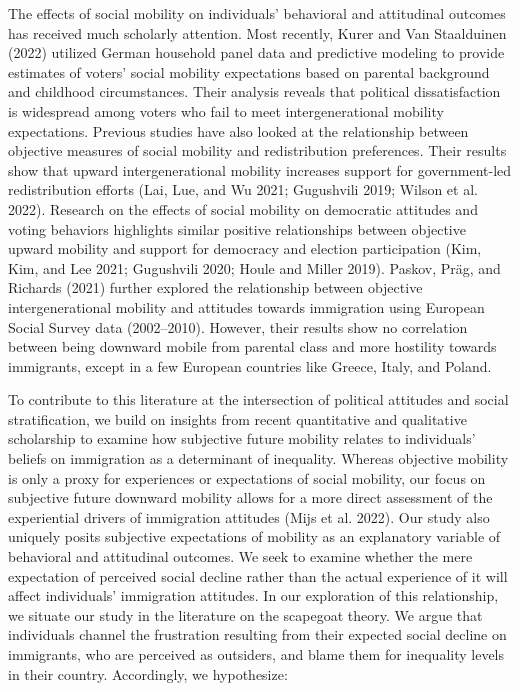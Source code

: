 \documentclass[
  11pt,
]{article}
\begin{document}
The effects of social mobility on individuals' behavioral and
attitudinal outcomes has received much scholarly attention. Most
recently, Kurer and Van Staalduinen (2022) utilized German household
panel data and predictive modeling to provide estimates of voters'
social mobility expectations based on parental background and childhood
circumstances. Their analysis reveals that political dissatisfaction is
widespread among voters who fail to meet intergenerational mobility
expectations. Previous studies have also looked at the relationship
between objective measures of social mobility and redistribution
preferences. Their results show that upward intergenerational mobility
increases support for government-led redistribution efforts (Lai, Lue,
and Wu 2021; Gugushvili 2019; Wilson et al. 2022). Research on the
effects of social mobility on democratic attitudes and voting behaviors
highlights similar positive relationships between objective upward
mobility and support for democracy and election participation (Kim, Kim,
and Lee 2021; Gugushvili 2020; Houle and Miller 2019). Paskov, Präg, and
Richards (2021) further explored the relationship between objective
intergenerational mobility and attitudes towards immigration using
European Social Survey data (2002--2010). However, their results show no
correlation between being downward mobile from parental class and more
hostility towards immigrants, except in a few European countries like
Greece, Italy, and Poland.

To contribute to this literature at the intersection of political
attitudes and social stratification, we build on insights from recent
quantitative and qualitative scholarship to examine how subjective
future mobility relates to individuals' beliefs on immigration as a
determinant of inequality. Whereas objective mobility is only a proxy
for experiences or expectations of social mobility, our focus on
subjective future downward mobility allows for a more direct assessment
of the experiential drivers of immigration attitudes (Mijs et al. 2022).
Our study also uniquely posits subjective expectations of mobility as an
explanatory variable of behavioral and attitudinal outcomes. We seek to
examine whether the mere expectation of perceived social decline rather
than the actual experience of it will affect individuals' immigration
attitudes. In our exploration of this relationship, we situate our study
in the literature on the scapegoat theory. We argue that individuals
channel the frustration resulting from their expected social decline on
immigrants, who are perceived as outsiders, and blame them for
inequality levels in their country. Accordingly, we hypothesize:
\end{document}
